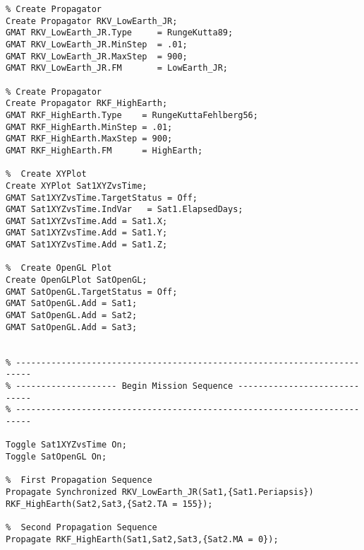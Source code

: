 \begin{Script}
\begin{verbatim}
% Create Propagator
Create Propagator RKV_LowEarth_JR;
GMAT RKV_LowEarth_JR.Type     = RungeKutta89;
GMAT RKV_LowEarth_JR.MinStep  = .01;
GMAT RKV_LowEarth_JR.MaxStep  = 900;
GMAT RKV_LowEarth_JR.FM       = LowEarth_JR;

% Create Propagator
Create Propagator RKF_HighEarth;
GMAT RKF_HighEarth.Type    = RungeKuttaFehlberg56;
GMAT RKF_HighEarth.MinStep = .01;
GMAT RKF_HighEarth.MaxStep = 900;
GMAT RKF_HighEarth.FM      = HighEarth;

%  Create XYPlot
Create XYPlot Sat1XYZvsTime;
GMAT Sat1XYZvsTime.TargetStatus = Off;
GMAT Sat1XYZvsTime.IndVar   = Sat1.ElapsedDays;
GMAT Sat1XYZvsTime.Add = Sat1.X;
GMAT Sat1XYZvsTime.Add = Sat1.Y;
GMAT Sat1XYZvsTime.Add = Sat1.Z;

%  Create OpenGL Plot
Create OpenGLPlot SatOpenGL;
GMAT SatOpenGL.TargetStatus = Off;
GMAT SatOpenGL.Add = Sat1;
GMAT SatOpenGL.Add = Sat2;
GMAT SatOpenGL.Add = Sat3;


% -------------------------------------------------------------------------
% -------------------- Begin Mission Sequence -----------------------------
% -------------------------------------------------------------------------

Toggle Sat1XYZvsTime On;
Toggle SatOpenGL On;

%  First Propagation Sequence
Propagate Synchronized RKV_LowEarth_JR(Sat1,{Sat1.Periapsis}) RKF_HighEarth(Sat2,Sat3,{Sat2.TA = 155});

%  Second Propagation Sequence
Propagate RKF_HighEarth(Sat1,Sat2,Sat3,{Sat2.MA = 0});

\end{verbatim}\end{Script}
